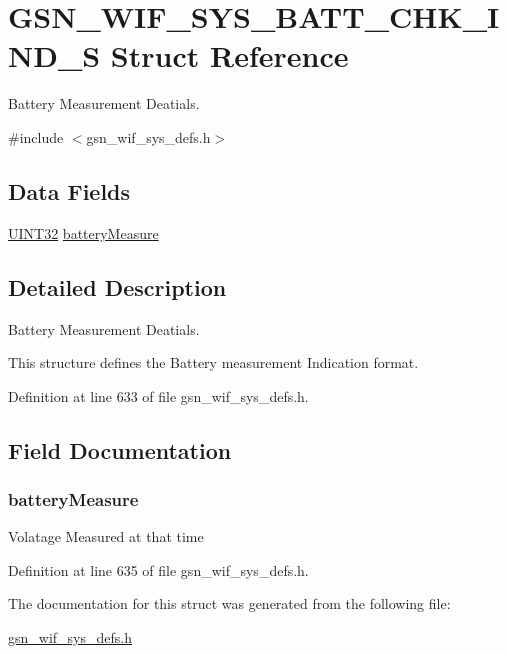 \hypertarget{a00345}{
\section{GSN\_\-WIF\_\-SYS\_\-BATT\_\-CHK\_\-IND\_\-S Struct Reference}
\label{a00345}
}


Battery Measurement Deatials.  




{\ttfamily \#include $<$gsn\_\-wif\_\-sys\_\-defs.h$>$}

\subsection*{Data Fields}
\begin{DoxyCompactItemize}
\item 
\hyperlink{a00660_gae1e6edbbc26d6fbc71a90190d0266018}{UINT32} \hyperlink{a00345_a11e8e59fdbc3c9b34dcb0191bc733ef3}{batteryMeasure}
\end{DoxyCompactItemize}


\subsection{Detailed Description}
Battery Measurement Deatials. 

This structure defines the Battery measurement Indication format. 

Definition at line 633 of file gsn\_\-wif\_\-sys\_\-defs.h.



\subsection{Field Documentation}
\hypertarget{a00345_a11e8e59fdbc3c9b34dcb0191bc733ef3}{
\subsubsection[{batteryMeasure}]{ {\bf batteryMeasure}}}
\label{a00345_a11e8e59fdbc3c9b34dcb0191bc733ef3}
Volatage Measured at that time 

Definition at line 635 of file gsn\_\-wif\_\-sys\_\-defs.h.



The documentation for this struct was generated from the following file:\begin{DoxyCompactItemize}
\item 
\hyperlink{a00612}{gsn\_\-wif\_\-sys\_\-defs.h}\end{DoxyCompactItemize}
